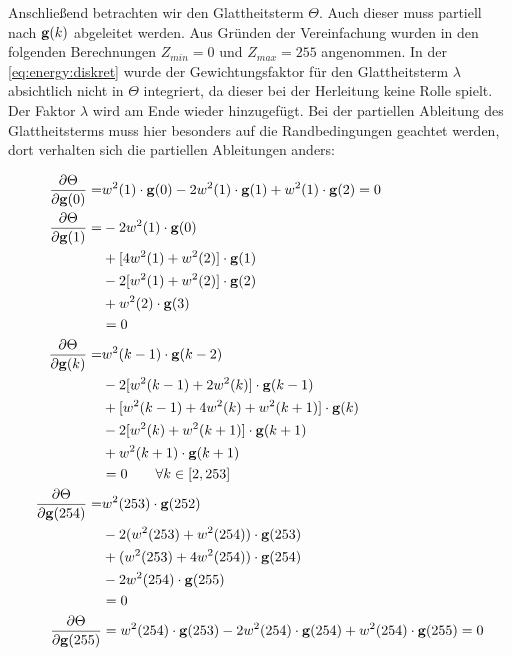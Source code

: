 Anschließend betrachten wir den Glattheitsterm $\Theta$. Auch dieser muss partiell nach $\mathbf g(k)$ abgeleitet werden. Aus Gründen der Vereinfachung wurden in den folgenden Berechnungen $Z_{min} = 0$ und $Z_{max} = 255$ angenommen. In der \autoref{eq:energy:diskret} wurde der Gewichtungsfaktor für den Glattheitsterm $\lambda$ absichtlich nicht in $\Theta$ integriert, da dieser bei der Herleitung keine Rolle spielt. Der Faktor $\lambda$ wird am Ende wieder hinzugefügt. Bei der partiellen Ableitung des Glattheitsterms muss hier besonders auf die Randbedingungen geachtet werden, dort verhalten sich die partiellen Ableitungen anders:


\begin{align}
\label{eq:partials:smoothness:0}
\frac{\partial \Theta}{\partial \mathbf g(0)} =& w^2(1)\cdot \mathbf g(0) -2w^2(1)\cdot \mathbf g(1) + w^2(1)\cdot \mathbf g(2) = 0\\
\label{eq:partials:smoothness:1}
\frac{\partial \Theta}{\partial \mathbf g(1)} = &-2w^2(1)\cdot \mathbf g(0) \nonumber \\
        &+[4w^2(1)+w^2(2)]\cdot \mathbf g(1) \nonumber \\
        &- 2 [w^2(1)+w^2(2)]\cdot \mathbf g(2) \nonumber \\
        &+ w^2(2)\cdot \mathbf g(3) \nonumber \\
        &= 0\\
\label{eq:partials:smoothness:k}
\frac{\partial \Theta}{\partial \mathbf g(k)} =& 
        w^2(k-1)\cdot \mathbf g(k-2)\nonumber\\
        &- 2[w^2(k-1)+2w^2(k)]\cdot \mathbf g(k-1) \nonumber\\
        &+ [w^2(k-1)+4w^2(k)+w^2(k+1)]\cdot \mathbf g(k)\nonumber\\ 
        &- 2[w^2(k)+w^2(k+1)] \cdot \mathbf g(k+1) \nonumber\\
        &+ w^2(k+1)\cdot \mathbf g(k+1) \nonumber\\
        &=0 \qquad \forall k \in [2,253]\\
\label{eq:partials:smoothness:254}
\frac{\partial \Theta}{\partial \mathbf g(254)} =& w^2(253)\cdot \mathbf g(252) \nonumber \\
        & -2 (w^2(253)+w^2(254))\cdot \mathbf g(253) \nonumber \\
        & +(w^2(253)+4 w^2(254)) \cdot \mathbf g(254)\nonumber \\
        & -2 w^2(254)\cdot \mathbf g(255)\nonumber \\ 
        &= 0\\
\label{eq:partials:smoothness:255}
\frac{\partial \Theta}{\partial \mathbf g(255)} &= 
    w^2(254)\cdot \mathbf g(253) 
    - 2 w^2(254)\cdot \mathbf g(254) 
    + w^2(254)\cdot \mathbf g(255)= 0
\end{align}

